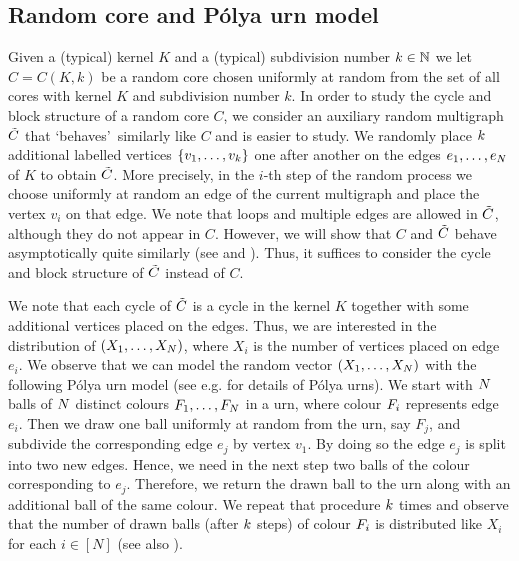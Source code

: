 \subsection{Random core and P\'olya urn model}\label{CBsub:construction_kernel_core}
Given a (typical) kernel $K$ and a (typical) subdivision number $k\in \mathbb{N}$ we let $C=C(K,k)$ be a random core chosen uniformly at random from the set of all cores with kernel $K$ and subdivision number $k$. In order to study the cycle and block structure of a random core $C$, we consider an auxiliary random multigraph $\tilde{C}$ that \lq behaves\rq\ similarly like $C$ and is easier to study. We randomly place $k$ additional labelled vertices $\{v_1, \ldots, v_k\}$ one after another on the edges $e_1, \ldots, e_{N}$ of $K$ to obtain $\tilde{C}$. More precisely, in the $i$-th step of the random process we choose uniformly at random an edge of the current multigraph and place the vertex $v_i$ on that edge. We note that loops and multiple edges are allowed in $\tilde{C}$, although they do not appear in $C$. However, we will show that $C$ and $\tilde{C}$ behave asymptotically quite similarly (see  and ). Thus, it suffices to consider the cycle and block structure of $\tilde{C}$ instead of $C$. 

We note that each cycle of $\tilde{C}$ is a cycle in the kernel $K$ together with some additional vertices placed on the edges. Thus, we are interested in the distribution of $(X_1, \ldots, X_N)$, where $X_i$ is the number of vertices placed on edge $e_i$. We observe that we can model the random vector $(X_1, \ldots, X_N)$ with the following P\'olya urn model (see e.g. \cite{JohnsonKotz1977, Mahmoud2009} for details of P\'olya urns). We start with $N$ balls of $N$ distinct colours $F_1, \ldots, F_N$ in a urn, where colour $F_i$ represents edge $e_i$. Then we draw one ball uniformly at random from the urn, say $F_j$, and subdivide the corresponding edge $e_j$ by vertex $v_1$. By doing so the edge $e_j$ is split into two new edges. Hence, we need in the next step two balls of the colour corresponding to $e_j$. Therefore, we return the drawn ball to the urn along with an additional ball of the same colour. We repeat that procedure $k$ times and observe that the number of drawn balls (after $k$ steps) of colour $F_i$ is distributed like $X_i$ for each $i\in [N]$ (see also ). 

